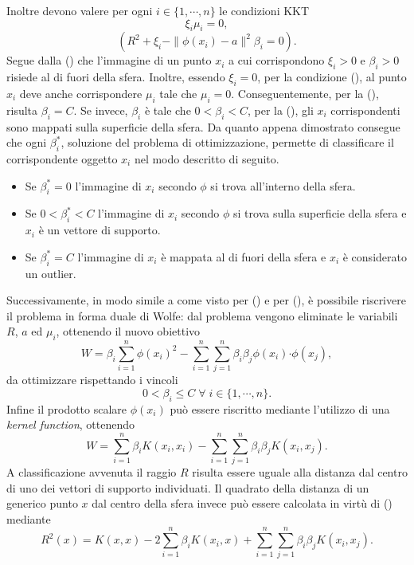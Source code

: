\documentclass [11pt,a4paper,twoside,openright] {book}
\begin{document}
Inoltre devono valere per ogni $i \in \lbrace 1, \cdots, n \rbrace$ le condizioni KKT
\begin{equation}\label{kkt1}
\xi_i\mu_i = 0,
\end{equation}
\begin{equation}\label{kkt2}
(R^2 + \xi_i - \parallel \phi(x_i)-a \parallel^2 \beta_i = 0).
\end{equation}
Segue dalla () che l'immagine di un punto $x_i$ a cui corrispondono $\xi_i > 0$ e $\beta_i > 0$ risiede al di fuori della sfera. Inoltre, essendo $\xi_i = 0$, per la condizione (), al punto $x_i$ deve anche corrispondere $\mu_i$ tale che $\mu_i = 0$. Conseguentemente, per la (), risulta $\beta_i = C$. Se invece, $\beta_i$ è tale che $0 < \beta_i < C$, per la (), gli $x_i$ corrispondenti sono mappati sulla superficie della sfera. Da quanto appena dimostrato consegue che ogni $\beta_i^*$, soluzione del problema di ottimizzazione, permette di classificare il corrispondente oggetto $x_i$ nel modo descritto di seguito.
\begin{itemize}
\item Se $\beta_i^*=0$ l'immagine di $x_i$ secondo $\phi$ si trova all'interno della sfera.
\item Se $0 < \beta_i^* < C$ l'immagine di $x_i$ secondo $\phi$ si trova sulla superficie della sfera e $x_i$ è un vettore di supporto.
\item Se $\beta_i^*=C$ l'immagine di $x_i$ è mappata al di fuori della sfera e $x_i$ è considerato un outlier.
\end{itemize}
Successivamente, in modo simile a come visto per () e per (), è possibile riscrivere il problema in forma duale di Wolfe\cite{wolfe1961duality}: dal problema vengono eliminate le variabili $R$, $a$ ed $\mu_i$, ottenendo il nuovo obiettivo
\begin{equation}
W = \beta_i\sum_{i=1}^n\phi(x_i)^2 - \sum_{i=1}^n\sum_{j=1}^n\beta_i\beta_j\phi(x_i)\boldsymbol{\cdot}\phi(x_j),
\end{equation}
da ottimizzare rispettando i vincoli
\begin{equation}
0 < \beta_i \leq C \; \forall \; i \in \lbrace 1, \cdots, n \rbrace.
\end{equation}
Infine il prodotto scalare $\phi(x_i)$ può essere riscritto mediante l'utilizzo di una \textit{kernel function}, ottenendo
\begin{equation}
W = \sum_{i=1}^n\beta_iK(x_i,x_i) - \sum_{i=1}^n\sum_{j=1}^n\beta_i\beta_jK(x_i,x_j).
\end{equation}
A classificazione avvenuta il raggio $R$ risulta essere uguale alla distanza dal centro di uno dei vettori di supporto individuati. Il quadrato della distanza di un generico punto $x$ dal centro della sfera invece può essere calcolata in virtù di () mediante
\begin{equation}\label{r}
R^2(x) = K(x,x) - 2 \sum_{i=1}^n \beta_i K(x_i,x) + \sum_{i=1}^n\sum_{j=1}^n\beta_i\beta_jK(x_i,x_j).
\end{equation}
\end{document}
